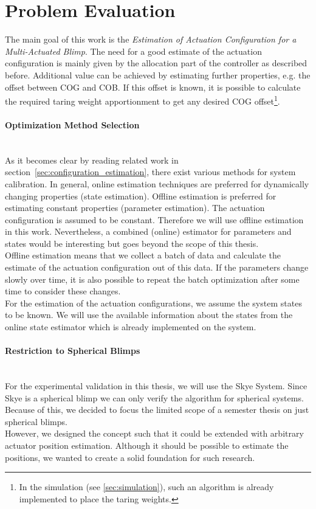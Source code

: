 \section{Problem Evaluation}
\label{sec:problem_evaluation}
The main goal of this work is the \textit{Estimation of Actuation Configuration for a Multi-Actuated Blimp}.
The need for a good estimate of the actuation configuration is mainly given by the allocation part of the controller as described before.
Additional value can be achieved by estimating further properties, e.g. the offset between COG and COB.
If this offset is known, it is possible to calculate the required taring weight apportionment to get any desired COG offset\footnote{
In the simulation (see \cref{sec:simulation}), such an algorithm is already implemented to place the taring weights.
}.

\paragraph{Optimization Method Selection} ~\\
As it becomes clear by reading related work in section~\ref{sec:configuration_estimation}, there exist various methods for system calibration.
In general, online estimation techniques are preferred for dynamically changing properties (state estimation).
Offline estimation is preferred for estimating constant properties (parameter estimation).
The actuation configuration is assumed to be constant.
Therefore we will use offline estimation in this work.
Nevertheless, a combined (online) estimator for parameters and states would be interesting but goes beyond the scope of this thesis.
\\

Offline estimation means that we collect a batch of data and calculate the estimate of the actuation configuration out of this data.
If the parameters change slowly over time, it is also possible to repeat the batch optimization after some time to consider these changes.
\\

For the estimation of the actuation configurations, we assume the system states to be known.
We will use the available information about the states from the online state estimator which is already implemented on the system.

\paragraph{Restriction to Spherical Blimps} ~\\
For the experimental validation in this thesis, we will use the Skye System.
Since Skye is a spherical blimp we can only verify the algorithm for spherical systems.
Because of this, we decided to focus the limited scope of a semester thesis on just spherical blimps. \\
However, we designed the concept such that it could be extended with arbitrary actuator position estimation.
Although it should be possible to estimate the positions, we wanted to create a solid foundation for such research.

